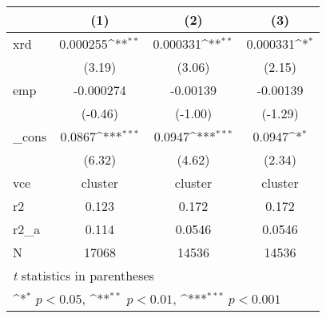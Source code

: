 {
\def\sym#1{\ifmmode^{#1}\else\(^{#1}\)\fi}
\begin{tabular}{l*{3}{c}}
\hline\hline
            &\multicolumn{1}{c}{(1)}         &\multicolumn{1}{c}{(2)}         &\multicolumn{1}{c}{(3)}         \\
\hline
xrd         &    0.000255\sym{**} &    0.000331\sym{**} &    0.000331\sym{*}  \\
            &      (3.19)         &      (3.06)         &      (2.15)         \\
[1em]
emp         &   -0.000274         &    -0.00139         &    -0.00139         \\
            &     (-0.46)         &     (-1.00)         &     (-1.29)         \\
[1em]
\_cons      &      0.0867\sym{***}&      0.0947\sym{***}&      0.0947\sym{*}  \\
            &      (6.32)         &      (4.62)         &      (2.34)         \\
\hline
vce         &     cluster         &     cluster         &     cluster         \\
r2          &       0.123         &       0.172         &       0.172         \\
r2\_a        &       0.114         &      0.0546         &      0.0546         \\
N           &       17068         &       14536         &       14536         \\
\hline\hline
\multicolumn{4}{l}{\footnotesize \textit{t} statistics in parentheses}\\
\multicolumn{4}{l}{\footnotesize \sym{*} \(p<0.05\), \sym{**} \(p<0.01\), \sym{***} \(p<0.001\)}\\
\end{tabular}
}
